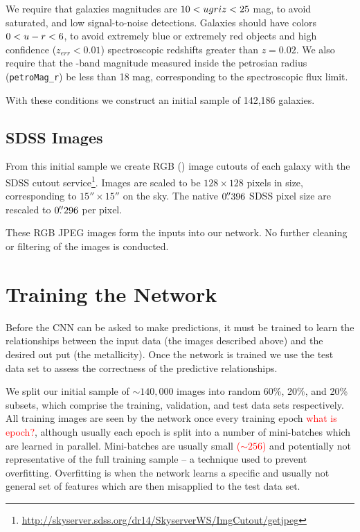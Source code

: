 \documentclass[fleqn,usenatbib]{mnras}
\newcommand{\editorial}[1]{\textcolor{red}{#1}}
\begin{document}
We require that galaxies magnitudes are $10 < \hbox{$u$} \hbox{$g$} \hbox{$r$} \hbox{$i$} \hbox{$z$} < 25$ mag, to avoid saturated, and low signal-to-noise detections. Galaxies should have colors $0 < \hbox{$u$}-\hbox{$r$} < 6$, to avoid extremely blue or extremely red objects and high confidence ($z_{err} < 0.01$) spectroscopic redshifts greater than $z=0.02$. We also require that the \sdssr-band magnitude measured inside the petrosian radius (\texttt{petroMag\_r}) be less than 18 mag, corresponding to the spectroscopic flux limit.

With these conditions we construct an initial sample of 142,186 galaxies.

\subsection{SDSS Images}
From this initial sample we create RGB (\sdssi\sdssr\sdssg) image cutouts of each galaxy with the SDSS cutout service\footnote{\url{http://skyserver.sdss.org/dr14/SkyserverWS/ImgCutout/getjpeg}}. Images are scaled to be $128\times128$ pixels in size, corresponding to $15''\times15''$ on the sky. The native $0\hbox{$.\!\!^{\prime\prime}$}396$ SDSS pixel size are rescaled to $0\hbox{$.\!\!^{\prime\prime}$}296$ per pixel.

These RGB JPEG images form the inputs into our network. No further cleaning or filtering of the images is conducted.

\section{Training the Network}\label{sec:training}
Before the CNN can be asked to make predictions, it must be trained to learn the relationships between the input data (the images described above) and the desired out put (the metallicity). Once the network is trained we use the test data set to assess the correctness of the predictive relationships.

We split our initial sample of $\sim 140,000$ images into random 60\%, 20\%, and 20\% subsets, which comprise the training, validation, and test data sets respectively. All training images are seen by the network once every training epoch \editorial{what is epoch?}, although usually each epoch is split into a number of mini-batches which are learned in parallel. Mini-batches are usually small \editorial{($\sim256$)} and potentially not representative of the full training sample -- a technique used to prevent overfitting. Overfitting is when the network learns a specific and usually not general set of features which are then misapplied to the test data set.
\end{document}
